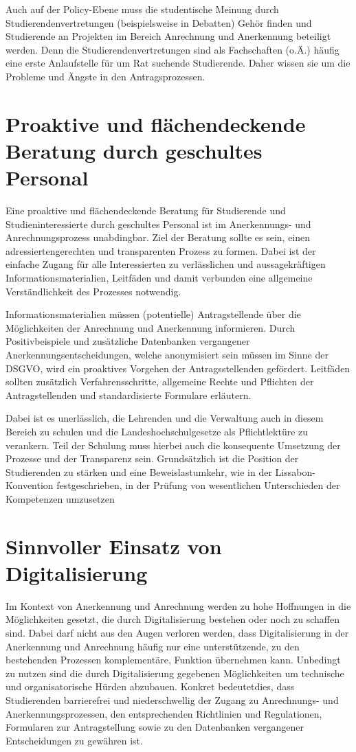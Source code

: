 \documentclass[DIV=calc]{scrartcl}
\begin{document}
Auch auf der Policy-Ebene muss die studentische Meinung durch Studierendenvertretungen (beispielsweise in Debatten) Gehör finden und Studierende an Projekten im Bereich Anrechnung und Anerkennung beteiligt werden. Denn die Studierendenvertretungen sind als Fachschaften (o.Ä.) häufig eine erste Anlaufstelle für um Rat suchende Studierende. Daher wissen sie um die Probleme und Ängste in den Antragsprozessen.

\section*{Proaktive und flächendeckende Beratung durch geschultes Personal}

Eine proaktive und flächendeckende Beratung für Studierende und Studieninteressierte durch geschultes Personal ist im Anerkennungs- und Anrechnungsprozess unabdingbar. Ziel der Beratung sollte es sein, einen adressiertengerechten und transparenten Prozess zu formen. Dabei ist der einfache Zugang für alle Interessierten zu verlässlichen und aussagekräftigen Informationsmaterialien, Leitfäden und damit verbunden eine allgemeine Verständlichkeit des Prozesses notwendig.

Informationsmaterialien müssen (potentielle) Antragstellende über die Möglichkeiten der Anrechnung und Anerkennung informieren. Durch Positivbeispiele und zusätzliche Datenbanken vergangener Anerkennungsentscheidungen, welche anonymisiert sein müssen im Sinne der DSGVO, wird ein proaktives Vorgehen der Antragsstellenden gefördert. Leitfäden sollten zusätzlich Verfahrensschritte, allgemeine Rechte und Pflichten der Antragstellenden und standardisierte Formulare erläutern.

Dabei ist es unerlässlich, die Lehrenden und die Verwaltung auch in diesem Bereich zu schulen und die Landeshochschulgesetze als Pflichtlektüre zu verankern. Teil der Schulung muss hierbei auch die konsequente Umsetzung der Prozesse und der Transparenz sein. Grundsätzlich ist die Position der Studierenden zu stärken und eine Beweislastumkehr, wie in der Lissabon-Konvention festgeschrieben, in der Prüfung von wesentlichen Unterschieden der Kompetenzen umzusetzen

\section*{Sinnvoller Einsatz von Digitalisierung}

Im Kontext von Anerkennung und Anrechnung werden zu hohe Hoffnungen in die Möglichkeiten gesetzt, die durch Digitalisierung bestehen oder noch zu schaffen sind. Dabei darf nicht aus den Augen verloren werden, dass Digitalisierung in der Anerkennung und Anrechnung häufig nur eine unterstützende, zu den bestehenden Prozessen komplementäre, Funktion übernehmen kann. Unbedingt zu nutzen sind die durch Digitalisierung gegebenen Möglichkeiten um technische und organisatorische Hürden abzubauen. Konkret bedeutetdies, dass Studierenden barrierefrei und niederschwellig der Zugang zu Anrechnungs- und Anerkennungsprozessen, den entsprechenden Richtlinien und Regulationen, Formularen zur Antragstellung sowie zu den Datenbanken vergangener Entscheidungen zu gewähren ist.
\end{document}
